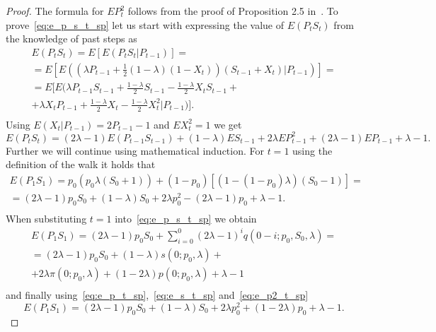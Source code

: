 \documentclass[runningheads]{CMSIM}
\begin{document}
    \begin{proof}
        The formula for $EP_{t}^{2}$ follows from the proof of Proposition
        2.5 in~\cite{ja2019apmat}.
        To prove~\eqref{eq:e_p_s_t_sp} let us
        start with expressing the value of $E(P_{t}S_{t})$ from the knowledge
        of past steps as
        \begin{gather*}
            E(P_{t}S_{t})=E[E(P_{t}S_{t}|P_{t-1})]=\\
            =E[E((\lambda P_{t-1}+\frac{1}{2}(1-\lambda)(1-X_{t}))(S_{t-1}+X_{t})|P_{t-1})]=\\
            =E[E(\lambda P_{t-1}S_{t-1}+\frac{1-\lambda}{2}S_{t-1}-\frac{1-\lambda}{2}X_{t}S_{t-1}+\\
                +\lambda X_{t}P_{t-1}+\frac{1-\lambda}{2}X_{t}-\frac{1-\lambda}{2}X_{t}^{2}|P_{t-1})].\\
        \end{gather*}
        Using $E(X_{t}|P_{t-1})=2P_{t-1}-1$ and $EX_{t}^{2}=1$ we get
        \begin{equation}
            E(P_{t}S_{t})=(2\lambda-1)E(P_{t-1}S_{t-1})+(1-\lambda)ES_{t-1}+2\lambda EP_{t-1}^{2}+(2\lambda-1)EP_{t-1}+\lambda-1.\label{eq:e_p_s_t-1_t_sp}
        \end{equation}
        Further we will continue using mathematical induction.
        For $t=1$
        using the definition of the walk it holds that
        \begin{gather*}
            E(P_{1}S_{1})=p_{0}(p_{0}\lambda(S_{0}+1))+(1-p_{0})[(1-(1-p_{0})\lambda)(S_{0}-1)]=\\
            =(2\lambda-1)p_{0}S_{0}+(1-\lambda)S_{0}+2\lambda p_{0}^{2}-(2\lambda-1)p_{0}+\lambda-1.\\
        \end{gather*}
        When substituting $t=1$ into~\eqref{eq:e_p_s_t_sp} we obtain
        \begin{gather*}
            E(P_{1}S_{1})=(2\lambda-1)p_{0}S_{0}+\sum_{i=0}^{0}(2\lambda-1)^{i}q(0-i;p_{0},S_{0},\lambda)=\\
            =(2\lambda-1)p_{0}S_{0}+(1-\lambda)s(0;p_{0},\lambda)+\\
            +2\lambda\pi(0;p_{0},\lambda)+(1-2\lambda)p(0;p_{0},\lambda)+\lambda-1\\
        \end{gather*}
        and finally using~\eqref{eq:e_p_t_sp},~\eqref{eq:e_s_t_sp} and~\eqref{eq:e_p2_t_sp}
        \[
            E(P_{1}S_{1})=(2\lambda-1)p_{0}S_{0}+(1-\lambda)S_{0}+2\lambda p_{0}^{2}+(1-2\lambda)p_{0}+\lambda-1.
\]
\end{proof}
\end{document}

